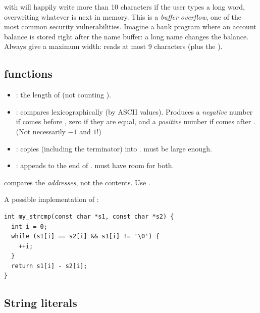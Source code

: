 \begin{important}
 with  will happily write more than 10 characters if
the user types a long word, overwriting whatever is next in memory. This is a \emph{buffer
overflow}, one of the most common security vulnerabilities. Imagine a bank program where an
account balance is stored right after the name buffer: a long name changes the balance. Always
give a maximum width:  reads at most 9 characters (plus the
).
\end{important}

\subsection{ functions}

\begin{itemize}
  \item {}: the length of  (not counting ).
  \item {}: compares lexicographically (by ASCII values). Produces a
    \emph{negative} number if  comes before , zero if they are equal, and a
    \emph{positive} number if  comes after . (Not necessarily $-1$ and $1$!)
  \item {}: copies  (including the terminator) into
    .  must be large enough.
  \item {}: appends  to the end of .  must
    have room for both.
\end{itemize}

\begin{important}
 compares the \emph{addresses}, not the contents. Use
.
\end{important}

A possible implementation of :
\begin{lstlisting}[style=c]
int my_strcmp(const char *s1, const char *s2) {
  int i = 0;
  while (s1[i] == s2[i] && s1[i] != '\0') {
    ++i;
  }
  return s1[i] - s2[i];
}
\end{lstlisting}

\subsection{String literals}

